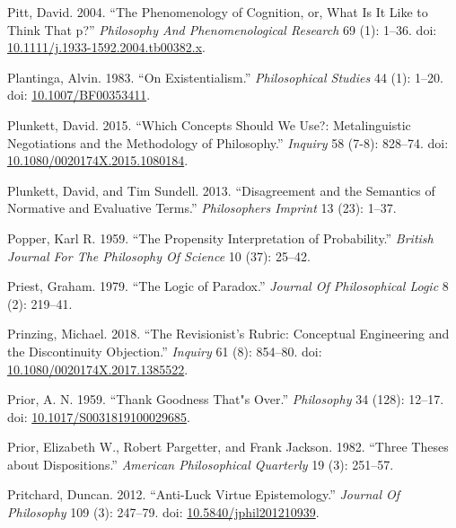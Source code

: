 \documentclass[
  10pt,
  letterpaper,
  DIV=11,
  numbers=noendperiod,
  twoside]{scrartcl}
\newlength{\cslhangindent}
\newenvironment{CSLReferences}[2] %
 {\begin{list}{}{%
  \setlength{\itemindent}{0pt}
  \setlength{\leftmargin}{0pt}
  \setlength{\parsep}{0pt}
  \ifodd #1
   \setlength{\leftmargin}{\cslhangindent}
   \setlength{\itemindent}{-1\cslhangindent}
  \fi
  \setlength{\itemsep}{#2\baselineskip}}}
 {\end{list}}
\begin{document}
\begin{CSLReferences}{1}{0}
Pitt, David. 2004. {``The Phenomenology of Cognition, or, What Is It
Like to Think That p?''} \emph{Philosophy And Phenomenological Research}
69 (1): 1--36. doi:
\href{https://doi.org/10.1111/j.1933-1592.2004.tb00382.x}{10.1111/j.1933-1592.2004.tb00382.x}.

Plantinga, Alvin. 1983. {``On Existentialism.''} \emph{Philosophical
Studies} 44 (1): 1--20. doi:
\href{https://doi.org/10.1007/BF00353411}{10.1007/BF00353411}.

Plunkett, David. 2015. {``Which Concepts Should We Use?: Metalinguistic
Negotiations and the Methodology of Philosophy.''} \emph{Inquiry} 58
(7-8): 828--74. doi:
\href{https://doi.org/10.1080/0020174X.2015.1080184}{10.1080/0020174X.2015.1080184}.

Plunkett, David, and Tim Sundell. 2013. {``Disagreement and the
Semantics of Normative and Evaluative Terms.''} \emph{Philosophers
Imprint} 13 (23): 1--37.

Popper, Karl R. 1959. {``The Propensity Interpretation of
Probability.''} \emph{British Journal For The Philosophy Of Science} 10
(37): 25--42.

Priest, Graham. 1979. {``The Logic of Paradox.''} \emph{Journal Of
Philosophical Logic} 8 (2): 219--41.

Prinzing, Michael. 2018. {``The Revisionist's Rubric: Conceptual
Engineering and the Discontinuity Objection.''} \emph{Inquiry} 61 (8):
854--80. doi:
\href{https://doi.org/10.1080/0020174X.2017.1385522}{10.1080/0020174X.2017.1385522}.

Prior, A. N. 1959. {``Thank Goodness That"s Over.''} \emph{Philosophy}
34 (128): 12--17. doi:
\href{https://doi.org/10.1017/S0031819100029685}{10.1017/S0031819100029685}.

Prior, Elizabeth W., Robert Pargetter, and Frank Jackson. 1982. {``Three
Theses about Dispositions.''} \emph{American Philosophical Quarterly} 19
(3): 251--57.

Pritchard, Duncan. 2012. {``Anti-Luck Virtue Epistemology.''}
\emph{Journal Of Philosophy} 109 (3): 247--79. doi:
\href{https://doi.org/10.5840/jphil201210939}{10.5840/jphil201210939}.


\end{CSLReferences}
\end{document}
